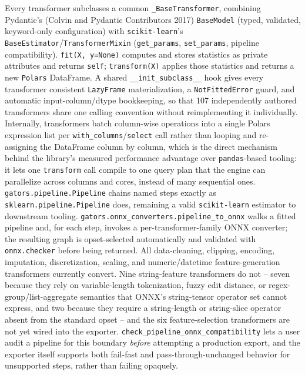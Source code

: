 \documentclass[
]{article}
\begin{document}
Every transformer subclasses a common \texttt{\_BaseTransformer},
combining Pydantic's (Colvin and Pydantic Contributors 2017)
\texttt{BaseModel} (typed, validated, keyword-only configuration) with
\texttt{scikit-learn}'s \texttt{BaseEstimator}/\texttt{TransformerMixin}
(\texttt{get\_params}, \texttt{set\_params}, pipeline compatibility).
\texttt{fit(X,\ y=None)} computes and stores statistics as private
attributes and returns \texttt{self}; \texttt{transform(X)} applies
those statistics and returns a new \texttt{Polars} DataFrame. A shared
\texttt{\_\_init\_subclass\_\_} hook gives every transformer consistent
\texttt{LazyFrame} materialization, a \texttt{NotFittedError} guard, and
automatic input-column/dtype bookkeeping, so that 107 independently
authored transformers share one calling convention without
reimplementing it individually. Internally, transformers batch
column-wise operations into a single Polars expression list per
\texttt{with\_columns}/\texttt{select} call rather than looping and
re-assigning the DataFrame column by column, which is the direct
mechanism behind the library's measured performance advantage over
\texttt{pandas}-based tooling: it lets one \texttt{transform} call
compile to one query plan that the engine can parallelize across columns
and cores, instead of many sequential ones.
\texttt{gators.pipeline.Pipeline} chains named steps exactly as
\texttt{sklearn.pipeline.Pipeline} does, remaining a valid
\texttt{scikit-learn} estimator to downstream tooling.
\texttt{gators.onnx\_converters.pipeline\_to\_onnx} walks a fitted
pipeline and, for each step, invokes a per-transformer-family ONNX
converter; the resulting graph is opset-selected automatically and
validated with \texttt{onnx.checker} before being returned. All
data-cleaning, clipping, encoding, imputation, discretization, scaling,
and numeric/datetime feature-generation transformers currently convert.
Nine string-feature transformers do not -- seven because they rely on
variable-length tokenization, fuzzy edit distance, or
regex-group/list-aggregate semantics that ONNX's string-tensor operator
set cannot express, and two because they require a string-length or
string-slice operator absent from the standard opset -- and the six
feature-selection transformers are not yet wired into the exporter.
\texttt{check\_pipeline\_onnx\_compatibility} lets a user audit a
pipeline for this boundary \emph{before} attempting a production export,
and the exporter itself supports both fail-fast and
pass-through-unchanged behavior for unsupported steps, rather than
failing opaquely.
\end{document}
